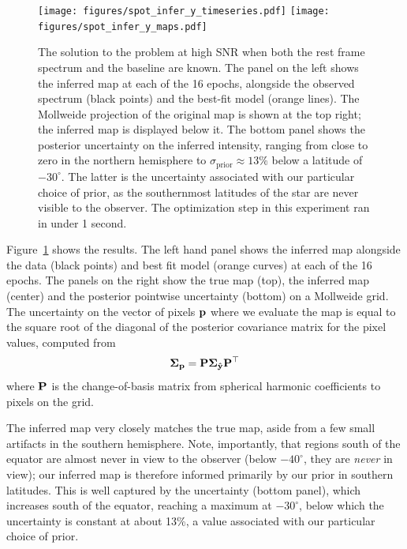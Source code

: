 \documentclass[modern]{aastex631}
\def\timeInferY{under 1 second}
\begin{document}
\begin{figure}[p!]
    \begin{centering}
        \texttt{[image: figures/spot\_infer\_y\_timeseries.pdf]}
        \texttt{[image: figures/spot\_infer\_y\_maps.pdf]}
        \caption{%
            The solution to the \spot problem at high SNR when both the rest frame spectrum and the baseline are known.
            The panel on the left shows the inferred map at each of the 16 epochs, alongside the observed spectrum (black points) and the best-fit model (orange lines). 
            The Mollweide projection of the original map is shown at the top right; the inferred map is displayed below it. 
            The bottom panel shows the posterior uncertainty on the inferred intensity, ranging from close to zero in the northern hemisphere to $\sigma_\mathrm{prior} \approx 13\%$ below a latitude of $-30^\circ$. 
            The latter is the uncertainty associated with our particular choice of prior, as the southernmost latitudes of the star are never visible to the observer.
            The optimization step in this experiment ran in \timeInferY.
        }
        \label{fig:spot_infer_y}
    \end{centering}
\end{figure}

Figure~\ref{fig:spot_infer_y} shows the results.
The left hand panel shows the inferred map alongside the data (black points) and best fit model (orange curves) at each of the 16 epochs.
The panels on the right show the true map (top), the inferred map (center) and the posterior pointwise uncertainty (bottom) on a Mollweide grid. 
The uncertainty on the vector of pixels ${\mathbf{p}}$ where we evaluate the map is equal to the square root of the diagonal of the posterior covariance matrix for the pixel values, computed from
%
\begin{align}
    \label{eq:spotstar:uncert}
    \boldsymbol{\Sigma}_{\mathbf{p}} = {\mathbf{P}} \boldsymbol{\Sigma}_{\mathbf{\hat{y}}}{\mathbf{P}}^\top
\end{align}
%
where ${\mathbf{P}}$ is the change-of-basis matrix from spherical harmonic coefficients to pixels on the grid.

The inferred map very closely matches the true map, aside from a few small artifacts in the southern hemisphere.
Note, importantly, that regions south of the equator are almost never in view to the observer (below $-40^\circ$, they are \emph{never} in view); our inferred map is therefore informed primarily by our prior in southern latitudes.
This is well captured by the uncertainty (bottom panel), which increases south of the equator, reaching a maximum at $-30^\circ$, below which the uncertainty is constant at about 13\%, a value associated with our particular choice of prior.
\end{document}
